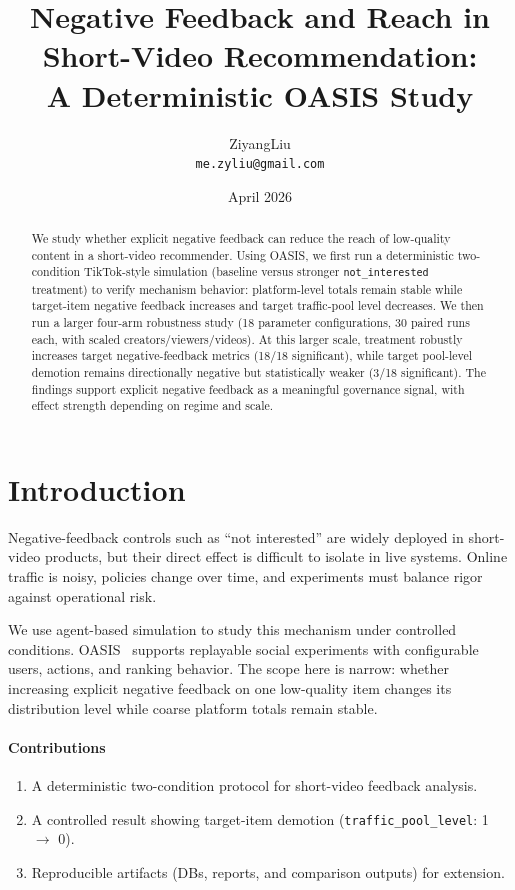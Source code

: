 \documentclass[11pt]{article}
\title{Negative Feedback and Reach in Short-Video Recommendation:\\
A Deterministic OASIS Study}
\author{ZiyangLiu\\\texttt{me.zyliu@gmail.com}}
\date{April 2026}
\begin{document}
\maketitle

\begin{abstract}
We study whether explicit negative feedback can reduce the reach of low-quality
content in a short-video recommender. Using OASIS, we first run a deterministic
two-condition TikTok-style simulation (baseline versus stronger
\texttt{not\_interested} treatment) to verify mechanism behavior: platform-level
totals remain stable while target-item negative feedback increases and target
traffic-pool level decreases. We then run a larger four-arm robustness study
(18 parameter configurations, 30 paired runs each, with scaled
creators/viewers/videos). At this larger scale, treatment robustly increases
target negative-feedback metrics (18/18 significant), while target pool-level
demotion remains directionally negative but statistically weaker (3/18
significant). The findings support explicit negative feedback as a meaningful
governance signal, with effect strength depending on regime and scale.
\end{abstract}

\section{Introduction}
Negative-feedback controls such as ``not interested'' are widely deployed in
short-video products, but their direct effect is difficult to isolate in live
systems. Online traffic is noisy, policies change over time, and experiments
must balance rigor against operational risk.

We use agent-based simulation to study this mechanism under controlled
conditions. OASIS~\cite{oasis2024} supports replayable social experiments with
configurable users, actions, and ranking behavior. The scope here is narrow:
whether increasing explicit negative feedback on one low-quality item changes
its distribution level while coarse platform totals remain stable.

\paragraph{Contributions}
\begin{enumerate}
\item A deterministic two-condition protocol for short-video feedback analysis.
\item A controlled result showing target-item demotion (\texttt{traffic\_pool\_level}: 1 $\rightarrow$ 0).
\item Reproducible artifacts (DBs, reports, and comparison outputs) for extension.
\end{enumerate}
\end{document}
